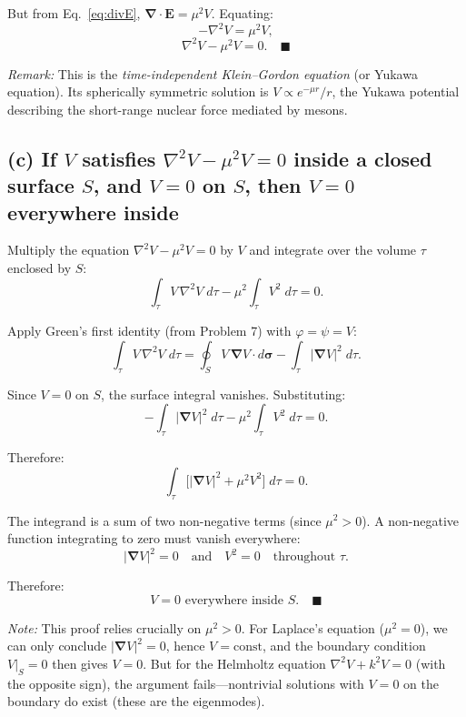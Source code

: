 \documentclass[12pt]{article}
\newcommand{\vect}[1]{\mathbf{#1}}
\newcommand{\grad}{\boldsymbol{\nabla}}
\newcommand{\divr}{\grad\cdot}
\begin{document}
But from Eq.~\eqref{eq:divE}, $\divr\vect{E} = \mu^2 V$. Equating:
\[
-\nabla^2 V = \mu^2 V,
\]
\[
\boxed{\nabla^2 V - \mu^2 V = 0}. \quad \blacksquare
\]

\textit{Remark:} This is the \emph{time-independent Klein--Gordon equation} (or Yukawa equation). Its spherically symmetric solution is $V \propto e^{-\mu r}/r$, the Yukawa potential describing the short-range nuclear force mediated by mesons.

\subsection*{(c) If $V$ satisfies $\nabla^2 V - \mu^2 V = 0$ inside a closed surface $S$, and $V = 0$ on $S$, then $V = 0$ everywhere inside}

Multiply the equation $\nabla^2 V - \mu^2 V = 0$ by $V$ and integrate over the volume $\tau$ enclosed by $S$:
\[
\int_\tau V\,\nabla^2 V\;d\tau - \mu^2\int_\tau V^2\;d\tau = 0.
\]

Apply Green's first identity (from Problem 7) with $\varphi = \psi = V$:
\[
\int_\tau V\,\nabla^2 V\;d\tau = \oint_S V\,\grad V\cdot d\boldsymbol{\sigma} - \int_\tau |\grad V|^2\;d\tau.
\]

Since $V = 0$ on $S$, the surface integral vanishes. Substituting:
\[
-\int_\tau |\grad V|^2\;d\tau - \mu^2\int_\tau V^2\;d\tau = 0.
\]

Therefore:
\[
\int_\tau \bigl[|\grad V|^2 + \mu^2 V^2\bigr]\;d\tau = 0.
\]

The integrand is a sum of two non-negative terms (since $\mu^2 > 0$). A non-negative function integrating to zero must vanish everywhere:
\[
|\grad V|^2 = 0 \quad \text{and} \quad V^2 = 0 \quad \text{throughout } \tau.
\]

Therefore:
\[
\boxed{V = 0 \text{ everywhere inside } S}. \quad \blacksquare
\]

\textit{Note:} This proof relies crucially on $\mu^2 > 0$. For Laplace's equation ($\mu^2 = 0$), we can only conclude $|\grad V|^2 = 0$, hence $V = \text{const}$, and the boundary condition $V|_S = 0$ then gives $V = 0$. But for the Helmholtz equation $\nabla^2 V + k^2 V = 0$ (with the opposite sign), the argument fails---nontrivial solutions with $V = 0$ on the boundary do exist (these are the eigenmodes).
\end{document}
